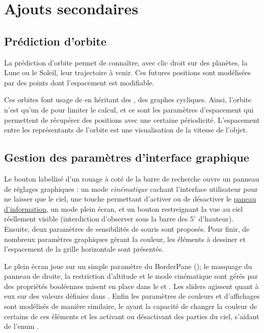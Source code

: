 \documentclass[10pt,a4paper]{report}
\begin{document}
\section*{Ajouts secondaires}

\subsection*{Prédiction d'orbite}

La prédiction d'orbite permet de connaître, avec clic droit sur des planètes, la Lune ou le Soleil, leur trajectoire à venir. Ces futures positions sont modélisées par des points dont l'espacement est modifiable.

Ces orbites font usage de  en héritant des , des graphes cycliques. Ainsi, l'orbite n'est qu'un  de \linebreak{} pour limiter le calcul, et ce sont les paramètres d'espacement qui permettent de récupérer des positions avec une certaine périodicité. L'espacement entre les représentants de l'orbite est une visualisation de la vitesse de l'objet.

\subsection*{Gestion des paramètres d'interface graphique}

Le bouton labellisé d'un rouage à coté de la barre de recherche ouvre un panneau de réglages graphiques : un mode \textit{cinématique} cachant l'interface utilisateur pour ne laisser que le ciel, une touche permettant d'activer ou de désactiver
le \hyperref[sec:info]{paneau d'information}, un mode plein écran, et un bouton restreignant la vue au ciel réellement visible (interdiction d'observer sous la barre des $5^{\circ}$ d'hauteur). Ensuite, deux paramètres de sensibilités de souris sont proposés. Pour finir, de nombreux paramètres graphiques gérant la couleur, les éléments à dessiner et l'espacement de la grille horizontale sont présentés.

Le plein écran joue sur un simple paramètre du BorderPane (); le masquage du panneau de droite, la restriction d'altitude et le mode cinématique sont gérés par des propriétés booléennes misent en place dans le  et \linebreak{}.
Les sliders agissent quant à eux sur des valeurs définies dans . Enfin les paramètres de couleurs et d'affichages sont modélisés de manière similaire, le  ayant la capacité de changer la couleur de certains de ces éléments et les  activant ou désactivant des parties du ciel, s'aidant de l'enum .
\end{document}
